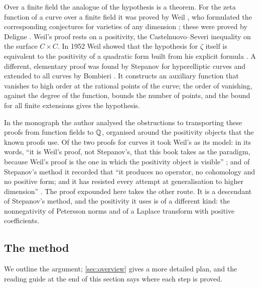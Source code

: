 Over a finite field the analogue of the hypothesis is a theorem. For the zeta function of a curve
over a finite field it was proved by Weil \cite{Weil1948}, who formulated the corresponding
conjectures for varieties of any dimension \cite{Weil1949}; these were proved by Deligne
\cite{Deligne1974,Deligne1980}. Weil's proof rests on a positivity, the Castelnuovo--Severi
inequality on the surface $C\times C$. In 1952 Weil showed that the hypothesis for $\zeta$ itself is
equivalent to the positivity of a quadratic form built from his explicit formula \cite{Weil1952}.
A different, elementary proof was found by Stepanov \cite{Stepanov1969} for hyperelliptic curves
and extended to all curves by Bombieri \cite{Bombieri1974}. It constructs an auxiliary function that vanishes to high order at
the rational points of the curve; the order of vanishing, against the degree of the function, bounds
the number of points, and the bound for all finite extensions gives the hypothesis.

In the monograph \cite{S03} the author analysed the obstructions to transporting these proofs from
function fields to $\mathbb{Q}$, organised around the positivity objects that the known proofs use. Of the two
proofs for curves it took Weil's as its model: in its words, ``it is Weil's proof, not Stepanov's,
that this book takes as the paradigm, because Weil's proof is the one in which the positivity object
is visible'' \cite[p.~279]{S03}; and of Stepanov's method it recorded that ``it produces no
operator, no cohomology and no positive form; and it has resisted every attempt at generalisation to
higher dimension'' \cite[p.~281]{S03}. The proof expounded here takes the other route. It is a
descendant of Stepanov's method, and the positivity it uses is of a different kind: the nonnegativity
of Petersson norms and of a Laplace transform with positive coefficients.

\subsection{The method}\label{ss:intro-method}
We outline the argument; \cref{sec:overview} gives a more detailed plan, and the reading guide at the
end of this section says where each step is proved.

